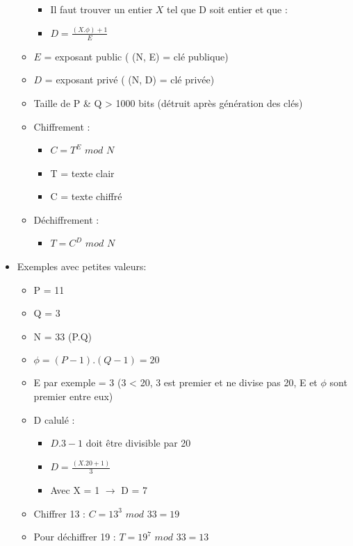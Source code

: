 \documentclass[a4paper]{article}
\begin{document}
\begin{itemize}[label=\textbullet, font=\Large]
\begin{itemize}[label=, font=\scriptsize]
\begin{itemize}
            \item Il faut trouver un entier $X$ tel que D soit entier et que :
            \item $D = \frac{(X.\phi) + 1}{E}$
        \end{itemize}
        \item $E$ = exposant public ( (N, E) = clé publique)
        \item $D$ = exposant privé  ( (N, D) = clé privée)
        \item Taille de P \& Q > 1000 bits (détruit après génération des clés)
        \item Chiffrement :
        \begin{itemize}
            \item $C = T^E$ $mod$ $N$
            \item T = texte clair
            \item C = texte chiffré
        \end{itemize}
        \item Déchiffrement :
        \begin{itemize}
            \item $T = C^D$ $mod$ $N$
        \end{itemize}
    \end{itemize}
    \item Exemples avec petites valeurs:
    \begin{itemize}[label=, font=\scriptsize]
        \item P = 11
        \item Q = 3
        \item N = 33 (P.Q)
        \item $\phi = (P-1).(Q-1) = 20$
        \item E par exemple = 3 (3 < 20, 3 est premier et ne divise pas 20, E et $\phi$ sont premier entre eux)
        \item D calulé :
        \begin{itemize}
            \item $D.3 - 1$ doit être divisible par 20
            \item $D = \frac{(X.20 + 1)}{3}$
            \item Avec X = 1 $\rightarrow$ D = 7
        \end{itemize}
        \item Chiffrer 13 : $C = 13^3$ $mod$ $33 = 19$
        \item Pour déchiffrer 19 : $T = 19^7$ $mod$ $33 = 13$
    \end{itemize}
\end{itemize}
\end{document}
